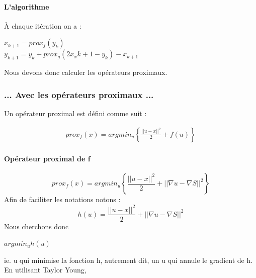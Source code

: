 \paragraph{L'algorithme}
À chaque itération on a : 
\begin{center}
$x_{k+1} = prox_f(y_k)$\\
$y_{k+1} = y_k+prox_g(2x_x{k+1}-y_k)-x_{k+1}$
\end{center}{}
Nous devons donc calculer les opérateurs proximaux. 
\subsubsection{... Avec les opérateurs proximaux ...}
Un opérateur proximal est défini comme suit : 
\begin{center}
\begin{equation*}
\begin{aligned}
prox_f(x) = argmin_u \left\{ \frac{||u-x||^2}{2}+ f(u)\right\}
\end{aligned}
\end{equation*}
\end{center}
\paragraph{Opérateur proximal de f}
\begin{equation*}
prox_f(x) = argmin_u\left\{\frac{||u-x||^2}{2}+||\nabla u -\nabla S ||^2 \right\}
\end{equation*}
Afin de faciliter les notations notons :
\begin{equation*}
h(u) = \frac{||u-x||^2}{2}+||\nabla u -\nabla S ||^2
\end{equation*} 
Nous cherchons donc 
\begin{center}
$argmin_u h(u)$
\end{center}
ie. u qui minimise la fonction h, autrement dit, un u qui annule le gradient de h.\\
En utilisant Taylor Young, 

